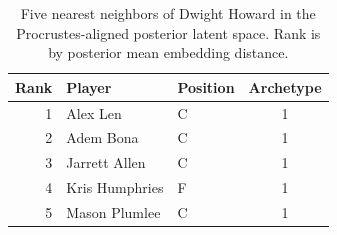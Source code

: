 \begin{table}[htbp]
  \centering\small
  \begin{tabular}{rllc}
    \toprule
    Rank & Player & Position & Archetype \\
    \midrule
    1 & Alex Len & C & 1 \\
    2 & Adem Bona & C & 1 \\
    3 & Jarrett Allen & C & 1 \\
    4 & Kris Humphries & F & 1 \\
    5 & Mason Plumlee & C & 1 \\
    \bottomrule
  \end{tabular}
  \caption{Five nearest neighbors of Dwight Howard in the Procrustes-aligned posterior latent space. Rank is by posterior mean embedding distance.}
  \label{tab:Dwight_Howard_neighbors}
\end{table}

